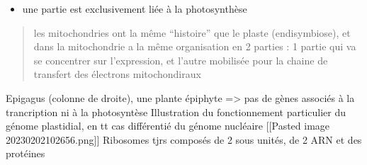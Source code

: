 \documentclass[
]{article}
\providecommand{\tightlist}{%
  \setlength{\itemsep}{0pt}\setlength{\parskip}{0pt}}
\begin{document}
\begin{itemize}
\tightlist
\item
  une partie est exclusivement liée à la photosynthèse
\end{itemize}

\begin{quote}
les mitochondries ont la même “histoire” que le plaste (endisymbiose),
et dans la mitochondrie a la même organisation en 2 parties : 1 partie
qui va se concentrer sur l’expression, et l’autre mobilisée pour la
chaine de transfert des électrons mitochondiraux
\end{quote}

Epigagus (colonne de droite), une plante épiphyte =\textgreater{} pas de
gènes associés à la trancription ni à la photosyntèse Illustration du
fonctionnement particulier du génome plastidial, en tt cas différentié
du génome nucléaire {[}{[}Pasted image 20230202102656.png{]}{]}
Ribosomes tjrs composés de 2 sous unités, de 2 ARN et des protéines
\end{document}
